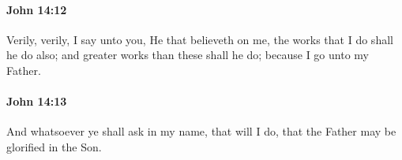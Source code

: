 		\paragraph{John 14:12} %
			\label{JOHN-14-12}

			Verily, verily, I say unto you, He that believeth on me, the works that I do shall he do also; and greater works than these shall he do; because I go unto my Father.

			\begin{framed}
				\scriptsize
				\begin{compactdesc}
					\item[SBLG] 
				\end{compactdesc}
			\end{framed}

		\paragraph{John 14:13} %
			\label{JOHN-14-13}

			And whatsoever ye shall ask in my name, that will I do, that the Father may be glorified in the Son.

